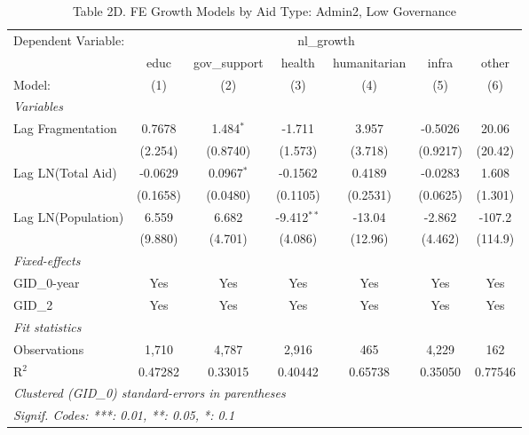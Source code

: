\begin{table}[H]
   \caption{Table 2D. FE Growth Models by Aid Type: Admin2, Low Governance}
   \centering
   \begin{tabular}{lcccccc}
      \tabularnewline \midrule \midrule
      Dependent Variable: & \multicolumn{6}{c}{nl\_growth}\\
                         & educ     & gov\_support  & health        & humanitarian & infra    & other \\   
      Model:             & (1)      & (2)           & (3)           & (4)          & (5)      & (6)\\  
      \midrule
      \emph{Variables}\\
      Lag Fragmentation  & 0.7678   & 1.484$^{*}$   & -1.711        & 3.957        & -0.5026  & 20.06\\   
                         & (2.254)  & (0.8740)      & (1.573)       & (3.718)      & (0.9217) & (20.42)\\   
      Lag LN(Total Aid)  & -0.0629  & 0.0967$^{*}$  & -0.1562       & 0.4189       & -0.0283  & 1.608\\   
                         & (0.1658) & (0.0480)      & (0.1105)      & (0.2531)     & (0.0625) & (1.301)\\   
      Lag LN(Population) & 6.559    & 6.682         & -9.412$^{**}$ & -13.04       & -2.862   & -107.2\\   
                         & (9.880)  & (4.701)       & (4.086)       & (12.96)      & (4.462)  & (114.9)\\   
      \midrule
      \emph{Fixed-effects}\\
      GID\_0-year        & Yes      & Yes           & Yes           & Yes          & Yes      & Yes\\  
      GID\_2             & Yes      & Yes           & Yes           & Yes          & Yes      & Yes\\  
      \midrule
      \emph{Fit statistics}\\
      Observations       & 1,710    & 4,787         & 2,916         & 465          & 4,229    & 162\\  
      R$^2$              & 0.47282  & 0.33015       & 0.40442       & 0.65738      & 0.35050  & 0.77546\\  
      \midrule \midrule
      \multicolumn{7}{l}{\emph{Clustered (GID\_0) standard-errors in parentheses}}\\
      \multicolumn{7}{l}{\emph{Signif. Codes: ***: 0.01, **: 0.05, *: 0.1}}\\
   \end{tabular}
\end{table}




